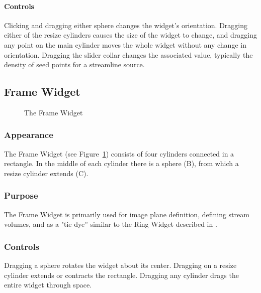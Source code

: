\paragraph{Controls} Clicking and dragging either sphere changes the widget's orientation.  Dragging either of the resize
cylinders causes the size of the widget to change, and dragging any point on
the main cylinder moves the whole widget without any change in orientation.
Dragging the slider collar changes the associated value, typically the
density of seed points for a streamline source.

\subsection{Frame Widget}
\label{sec:view-framewidget} 

\begin{figure}[htb]
  \begin{makeimage}
  \end{makeimage}
  \framewidget
  \caption{\label{fig:framewidget} The Frame Widget}
\end{figure}


\subsubsection{Appearance} The
Frame Widget (see Figure~\ref{fig:framewidget}) consists of four cylinders connected in a rectangle.  In
the middle of each cylinder there is a sphere (B), from which
a resize cylinder extends (C).

\subsubsection{Purpose} The Frame Widget is primarily used for image
plane definition, defining stream volumes, and as a "tie dye'' similar to
the Ring Widget described in .

\subsubsection{Controls} Dragging a sphere rotates the widget about its center. Dragging on a resize cylinder extends or contracts the rectangle.
Dragging any cylinder drags the entire widget through space.


